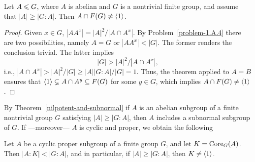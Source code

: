 \begin{cor}\label{abelian-intersects-fitting}
    Let\/ $A\leqslant G$, where\/ $A$ is abelian and\/ $G$ is a nontrivial finite group, and assume that\/ $|A|\ge|G:A|$. Then\/ $A\cap F(G)\ne\langle1\rangle$.
\end{cor}

\begin{proof} Given $x\in G$, $|AA^x|=|A|^2/|A\cap A^x|$. By Problem~\ref{problem-1.A.4} there are two possibilities, namely $A=G$ or $|AA^x|<|G|$. The former renders the conclusion trivial. The latter implies
$$
    |G| > |A|^2/|A\cap A^x|,
$$
i.e., $|A\cap A^x|>|A|^2/|G|\ge |A||G:A|/|G|=1$. Thus, the theorem applied to $A=B$ ensures that $\langle1\rangle\varsubsetneq A\cap A^y\subseteq F(G)$ for some $y\in G$, which implies $A\cap F(G)\ne\langle1\rangle$.  \end{proof}

\begin{rem}
    By\/ {\upshape Theorem~\ref{nilpotent-and-subnormal}} if\/ $A$ is an abelian subgroup of a finite nontrivial group\/ $G$ satisfying\/ $|A|\ge|G:A|$, then\/ $A$ includes a subnormal subgroup of\/ $G$. If ---moreover--- $A$ is cyclic and proper, we obtain the following
\end{rem}

\begin{thm}\label{lucchini-thm}
    {\upshape[Lucchini]} Let\/ $A$ be a cyclic proper subgroup of a finite group\/ $G$, and let\/ $K={\rm Core}_G(A)$. Then\/ $|A:K|<|G:A|$, and in particular, if\/ $|A|\ge|G:A|$, then\/ $K\ne\langle1\rangle$.
\end{thm}

